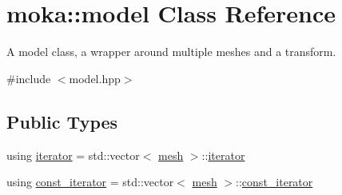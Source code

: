 \hypertarget{classmoka_1_1model}{}\section{moka\+::model Class Reference}
\label{classmoka_1_1model}


A model class, a wrapper around multiple meshes and a transform.  




{\ttfamily \#include $<$model.\+hpp$>$}

\subsection*{Public Types}
\begin{DoxyCompactItemize}
\item 
using \mbox{\hyperlink{classmoka_1_1model_a2fa7c32a9fe64904609be78bb8d1abdf}{iterator}} = std\+::vector$<$ \mbox{\hyperlink{classmoka_1_1mesh}{mesh}} $>$\+::\mbox{\hyperlink{classmoka_1_1model_a2fa7c32a9fe64904609be78bb8d1abdf}{iterator}}
\item 
using \mbox{\hyperlink{classmoka_1_1model_a2320ba22d7cfd04cd0bba753ab8e10a8}{const\+\_\+iterator}} = std\+::vector$<$ \mbox{\hyperlink{classmoka_1_1mesh}{mesh}} $>$\+::\mbox{\hyperlink{classmoka_1_1model_a2320ba22d7cfd04cd0bba753ab8e10a8}{const\+\_\+iterator}}
\end{DoxyCompactItemize}

